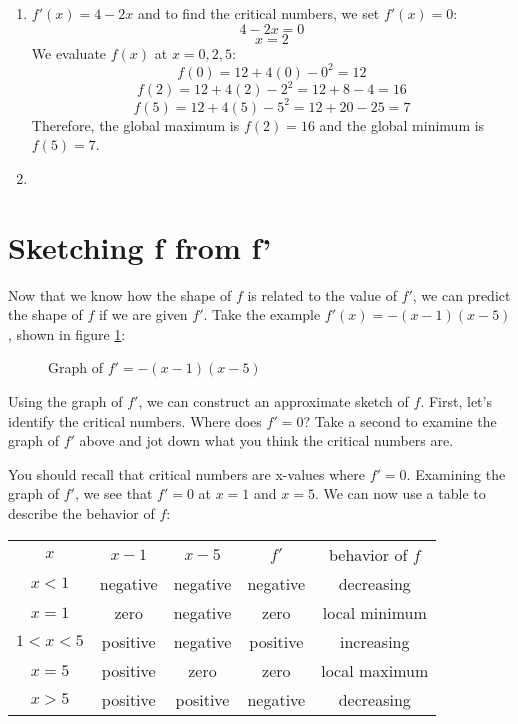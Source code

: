 \begin{Answer}[ref=gloext2]
\begin{enumerate}
	\item $f'(x) = 4-2x$ and to find the critical numbers, we set $f'(x)=0$:
$$4-2x=0$$
$$x=2$$
We evaluate $f(x)$ at $x=0, 2, 5$:
$$f(0) = 12+4(0)-0^2=12$$
$$f(2) = 12+4(2)-2^2=12+8-4=16$$
$$f(5) = 12+4(5)-5^2=12+20-25=7$$
Therefore, the global maximum is $f(2) = 16$ and the global minimum is $f(5) = 7$.
\item %
\end{enumerate}
\end{Answer}

\section{Sketching f from f'}
Now that we know how the shape of $f$ is related to the value of $f'$, we can predict the shape of $f$ if we are given $f'$. Take the example $f'(x) = -(x-1)(x-5)$, shown in figure \ref{fig:sketchf1}:

\begin{figure}[htbp]
	\centering
	\caption{Graph of $f'=-(x-1)(x-5)$}
	\label{fig:sketchf1}
\end{figure}

Using the graph of $f'$, we can construct an approximate sketch of $f$. First, let's identify the critical numbers. Where does $f'=0$? Take a second to examine the graph of $f'$ above and jot down what you think the critical numbers are.

You should recall that critical numbers are x-values where $f'=0$. Examining the graph of $f'$, we see that $f'=0$ at $x=1$ and $x=5$. We can now use a table to describe the behavior of $f$:

\begin{tabular}{c|c|c|c|c}
$x$ & $x-1$ & $x-5$ & $f'$ & behavior of $f$\\
$x<1$ & negative & negative & negative & decreasing\\
$x=1$ & zero & negative & zero & local minimum\\
$1<x<5$ & positive & negative & positive & increasing\\
$x=5$ & positive & zero & zero & local maximum\\
$x>5$ & positive & positive & negative & decreasing\\
\end{tabular}

